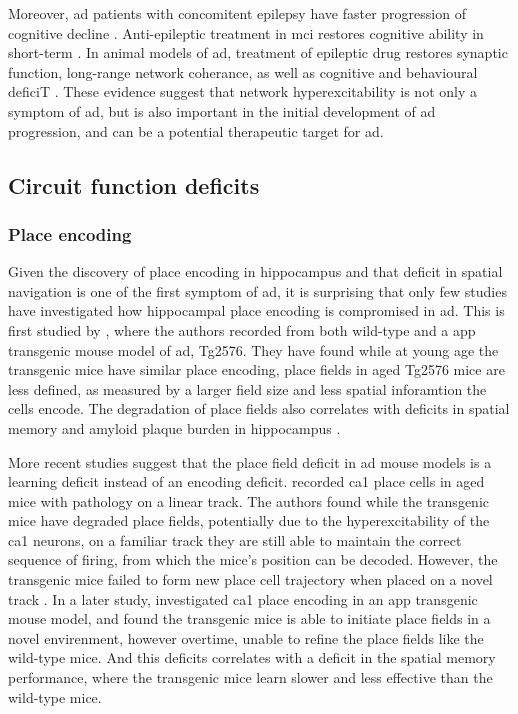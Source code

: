 Moreover, \gls{ad} patients with concomitent epilepsy have faster progression of cognitive decline \citep{vossel13, bakker15}. Anti-epileptic treatment in \gls{mci} restores cognitive ability in short-term \citep{bakker15}. In animal models of \gls{ad}, treatment of epileptic drug restores synaptic function, long-range network coherance, as well as cognitive and behavioural deficiT \citep{sanchez12, busche15}. These evidence suggest that network hyperexcitability is not only a symptom of \gls{ad}, but is also important in the initial development of \gls{ad} progression, and can be a potential therapeutic target for \gls{ad}.

\subsection{Circuit function deficits}
\begin{comment}
\subsubsection{synchrony}
\citep{goutagny13}
\end{comment}
\subsubsection{Place encoding}
Given the discovery of place encoding in hippocampus and that deficit in spatial navigation is one of the first symptom of \gls{ad}, it is surprising that only few studies have investigated how hippocampal place encoding is compromised in \gls{ad}. This is first studied by \citet{cacucci08}, where the authors recorded from both wild-type and a \gls{app} transgenic mouse model of \gls{ad}, Tg2576. They have found while at young age the transgenic mice have similar place encoding, place fields in aged Tg2576 mice are less defined, as measured by a larger field size and less spatial inforamtion the cells encode. The degradation of place fields also correlates with deficits in spatial memory and amyloid plaque burden in hippocampus \citep{cacucci08}.

More recent studies suggest that the place field deficit in \gls{ad} mouse models is a learning deficit instead of an encoding deficit. \citet{cheng13} recorded \gls{ca1} place cells in aged mice with \atau{} pathology on a linear track. The authors found while the transgenic mice have degraded place fields, potentially due to the hyperexcitability of the \gls{ca1} neurons, on a familiar track they are still able to maintain the correct sequence of firing, from which the mice's position can be decoded. However, the transgenic mice failed to form new place cell trajectory when placed on a novel track \citep{cheng13}. In a later study, \citet{zhao14} investigated \gls{ca1} place encoding in an \gls{app} transgenic mouse model, and found the transgenic mice is able to initiate place fields in a novel envirenment, however overtime, unable to refine the place fields like the wild-type mice. And this deficits correlates with a deficit in the spatial memory performance, where the transgenic mice learn slower and less effective than the wild-type mice.

